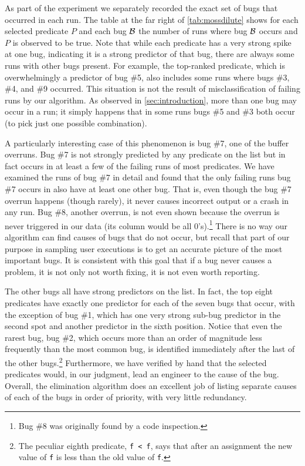 As part of the experiment we separately recorded the exact set of
bugs that occurred in each run.
The table at the far right of \autoref{tab:mossdilute} shows for
each selected predicate $P$ and each bug ${\cal B}$ the number of runs where
bug ${\cal B}$ occurs and $P$ is observed to be true.  Note that while each
predicate has a very strong spike at one bug, indicating it is a
strong predictor of that bug, there are always some runs with other
bugs present.  For example, the top-ranked predicate, which is
overwhelmingly a predictor of bug \#5, also includes some runs where
bugs \#3, \#4, and \#9 occurred.  This situation is not the result of
misclassification of failing runs by our algorithm.  As observed in
\autoref{sec:introduction}, more than one bug may occur in a run;
it simply happens that in some runs bugs \#5 and \#3 both occur (to
pick just one possible combination).

A particularly interesting case of this phenomenon is bug \#7, one of
the buffer overruns.  Bug \#7 is not strongly predicted by any
predicate on the list but in fact occurs in at least a few of the
failing runs of most predicates.  We have examined the runs of bug \#7
in detail and found that the only failing runs bug \#7 occurs in also
have at least one other bug.  That is, even though the bug \#7 overrun
happens (though rarely), it never causes incorrect output or a crash
in any run.  Bug \#8, another overrun, is not even shown because the
overrun is never triggered in our data (its column would be all
0's).\footnote{Bug \#8 was originally found by a code inspection.}
There is no way our algorithm can find causes of bugs that do not
occur, but recall that part of our purpose in sampling user executions
is to get an accurate picture of the most important bugs. It is
consistent with this goal that if a bug never causes a problem, it is
not only not worth fixing, it is not even worth reporting.

The other bugs all have strong predictors on the list.  In fact,
the top eight predicates have exactly one predictor for each of the seven
bugs that occur, with the exception of bug \#1, which has one very
strong sub-bug predictor in the second spot and another predictor
in the sixth position.  Notice that even the rarest bug, bug \#2,
which occurs more than an order of magnitude less frequently than
the most common bug, is identified immediately after the last of
the other bugs.\footnote{The peculiar eighth predicate, \texttt{f < f},
says that after an assignment the new value of {\tt f} is less than
the old value of {\tt f}.}  Furthermore, we have verified by hand that
the selected predicates would, in our judgment, lead an engineer to
the cause of the bug. Overall, the elimination algorithm does an excellent
job of listing separate causes of each of the bugs in order of priority,
with very little redundancy.


